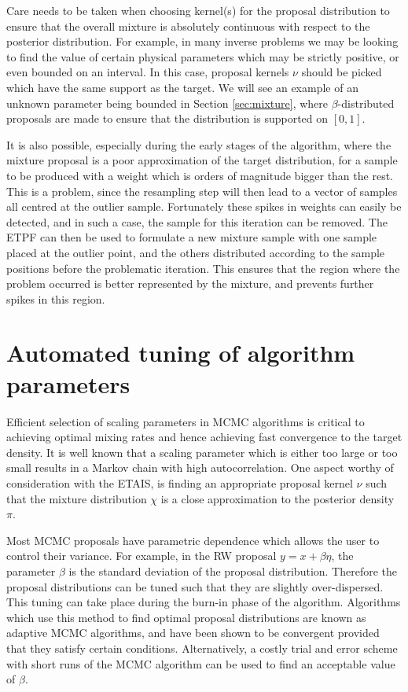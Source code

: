 \documentclass[final]{siamltex}
\newcommand{\revised}{}
\begin{document}
Care needs to be taken when choosing kernel(s) for the proposal distribution to
ensure that the overall mixture is absolutely continuous with respect to
the posterior distribution. {\revised For example, in many inverse problems we
may be looking to find the value of certain physical parameters which
may be strictly positive, or even bounded on an interval. In
this case, proposal kernels $\nu$ should be picked which have the same
support as the target. We will see an example of an unknown parameter
being bounded in Section \ref{sec:mixture}, where
$\beta$-distributed proposals are made to ensure that the distribution
is supported on $[0,1]$.}


It is also possible, especially during the early stages of the
algorithm, where the mixture proposal is a poor approximation of the
target distribution, for a sample to be produced with a weight which
is orders of magnitude bigger than the rest. This is a problem, since
the resampling step will then lead to a vector of samples all
centred at the outlier sample. Fortunately these spikes in weights can
easily be detected, and in such a case, the sample for this iteration
can be removed. The ETPF can then be used to formulate a new mixture
sample with one sample placed at the outlier point, and the others
distributed according to the sample positions before the problematic
iteration. This ensures that the region where the problem occurred is
better represented by the mixture, and prevents further spikes in this region.


\section{Automated tuning of algorithm parameters}\label{Sec:adapt}

Efficient selection of scaling parameters in MCMC algorithms is
critical to achieving optimal mixing rates and hence achieving fast
convergence to the target density. It is well known that a scaling
parameter which is either too large or too small results in a Markov
chain with high autocorrelation. One aspect worthy of consideration
with the ETAIS, is finding an appropriate proposal kernel $\nu$ such
that the mixture distribution $\chi$ is a close approximation to the
posterior density $\pi$.

Most MCMC proposals have parametric dependence which
allows the user to control their variance. For example, in the RW
proposal $y = x + \beta \eta$, the parameter $\beta$ is the standard deviation
of the proposal distribution. Therefore the proposal distributions can
be tuned such that they are slightly over-dispersed. This tuning
can take place during the burn-in phase of the algorithm. Algorithms
which use this method to find optimal proposal distributions are known
as adaptive MCMC algorithms, and have been shown to be convergent
provided that they satisfy certain
conditions\cite{roberts2007coupling,roberts2009examples}.
Alternatively, a costly trial and error scheme with short runs of the
MCMC algorithm can be used to find an acceptable value of $\beta$.
\end{document}
